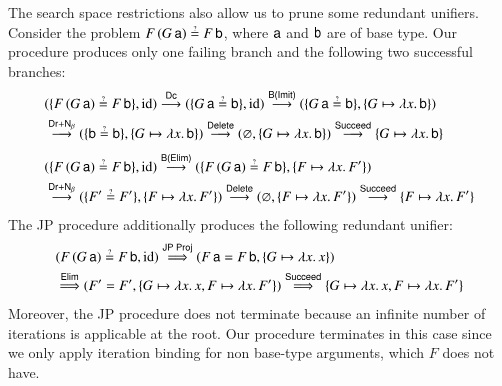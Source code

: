 \begin{exa}
The search space restrictions also allow us to prune some redundant unifiers. Consider the problem $F \, (G\,\cst{a}) \unif F \,
\cst{b}$, where $\mathsf{a}$ and $\mathsf{b}$ are of base type. 
Our procedure produces only one failing branch and the following two successful branches:
%
\begin{align*}
&
(\{ F\,(G\,\cst{a}) \unif F \, \cst{b} \}, \makeop{id})
\overset{\textsf{Dc}}{\newunifarrow}
(\{ G\,\cst{a} \unif \cst{b} \}, \makeop{id})
\overset{\textsf{B(Imit)}}{\newunifarrow}
(\{ G\,\cst{a} \unif \cst{b} \}, \{ G \mapsto \lambda x.\, \cst{b} \})
\\ &
\overset{\textsf{Dr}+\textsf{N}_\beta}{\newunifarrow}
(\{ \cst{b} \unif \cst{b} \}, \{ G \mapsto \lambda x.\, \cst{b} \})
\overset{\textsf{Delete}}{\newunifarrow}
(\varnothing, \{ G \mapsto \lambda x.\, \cst{b} \})
\overset{\textsf{Succeed}}{\newunifarrow}
\{ G \mapsto \lambda x.\, \cst{b} \}
\\[1\jot]
&
(\{ F\,(G\,\cst{a}) \unif F \, \cst{b} \}, \makeop{id})
\overset{\textsf{B(Elim)}}{\newunifarrow}
(\{ F\,(G\,\cst{a}) \unif F \, \cst{b} \}, \{ F \mapsto \lambda x.\, F' \})
\\ &
\overset{\textsf{Dr}+\textsf{N}_\beta}{\newunifarrow}
(\{ F' \unif F' \}, \{ F \mapsto \lambda x.\, F' \})
\overset{\textsf{Delete}}{\newunifarrow}
(\varnothing, \{ F \mapsto \lambda x.\, F' \})
\overset{\textsf{Succeed}}{\newunifarrow}
\{ F \mapsto \lambda x.\, F' \}
\end{align*}
%
The JP procedure additionally produces the following redundant unifier:
%
\begin{align*}
    &
    ( F\,(G\,\cst{a}) \unif F \, \cst{b} , \makeop{id})
    \overset{\textsf{JP Proj}}{\jpunifarrow}
    ( F \, \cst{a} = F \, \cst{b} , \{ G \mapsto \lambda x. \, x \})
    \\ &
    \overset{\textsf{Elim}}{\jpunifarrow}
    (F' = F' , \{ G \mapsto \lambda x. \, x, F \mapsto \lambda x. \, F' \})
    \overset{\textsf{Succeed}}{\jpunifarrow}
    \{ G \mapsto \lambda x. \, x, F \mapsto \lambda x. \, F' \}
\end{align*}
Moreover, the JP procedure does not terminate because an infinite number of iterations is 
applicable at the root. Our procedure terminates in this case since we only apply iteration
binding for non base-type arguments, which $F$ does not have.
\end{exa}

